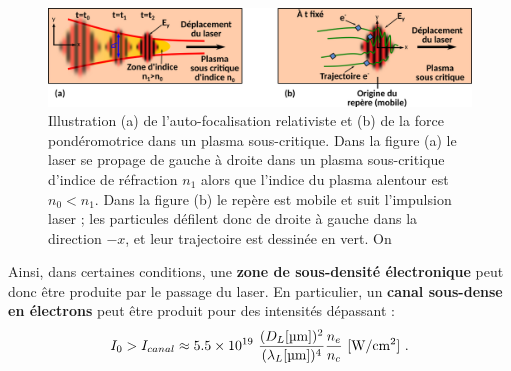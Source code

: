 \begin{refsection}
\begin{figure}[hbtp]
    \centering
    \includegraphics[width=\linewidth]{2-laser/interaction_laser_plasma.png}
    \caption{Illustration (a) de l'auto-focalisation relativiste et (b) de la force pondéromotrice dans un plasma sous-critique. Dans la figure (a) le laser se propage de gauche à droite dans un plasma sous-critique d'indice de réfraction $n_1$ alors que l'indice du plasma alentour est $n_0<n_1$. 
    Dans la figure (b) le repère est mobile et suit l'impulsion laser ; les particules défilent donc de droite à gauche dans la direction $-x$, et leur trajectoire est dessinée en vert. On 
    }
    \label{fig:2-interaction_laser_plasma}
\end{figure}

Ainsi, dans certaines conditions, une \textbf{zone de sous-densité électronique} peut donc être produite par le passage du laser. En particulier, un \textbf{canal sous-dense en électrons} peut être produit pour des intensités dépassant \parencite{gibbon_2013} : 
\begin{equation}
    I_0 > I_{canal} \approx 5.5\times 10^{19} ~ \dfrac{(D_L \si{[\um]})^2}{(\lambda_L \si{[\um]})^4} \dfrac{n_e}{n_c} ~ \si{[\W\per\cm^2]} ~ \rm .
    \label{eq:2-seuil_canal_ponderomoteur}
\end{equation}


\end{refsection}
